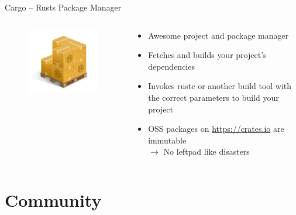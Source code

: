 \documentclass[aspectratio=1610,t]{beamer}
\begin{document}
\begin{frame}[c]{Cargo -- Rusts Package Manager}
  \begin{columns}[onlytextwidth]
    \begin{column}{.3\textwidth}
      \centering
      \begin{figure}
      \includegraphics[width=\textwidth]{./Cargo-Logo-Small.png}
      \end{figure}
    \end{column}
    \begin{column}{.7\textwidth}
      \begin{itemize}
        \item Awesome project and package manager
        \item Fetches and builds your project’s dependencies
        \item Invokes rustc or another build tool with the correct parameters
          to build your project
        \item OSS packages on \url{https://crates.io} are immutable\\ $\rightarrow$
          No leftpad like disasters
      \end{itemize}
    \end{column}
  \end{columns}
\end{frame}

\section{Community}
\end{document}
